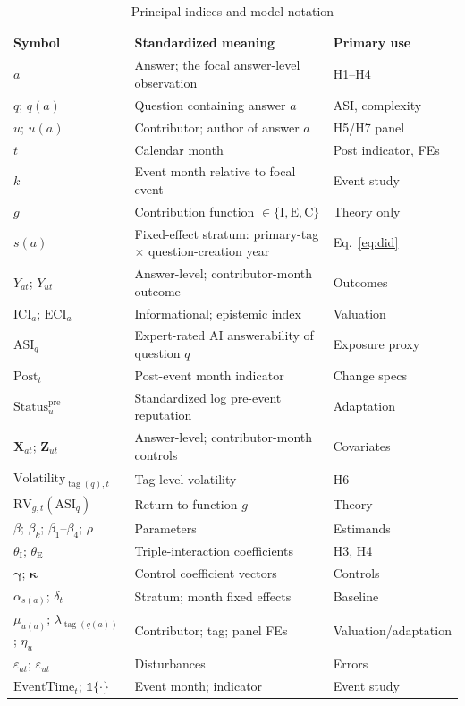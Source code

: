 \begin{table}[t]
\centering
\caption{Principal indices and model notation}
\label{tab:notation}
\scriptsize
\begin{tabular}{@{}p{}p{}p{}@{}}
\toprule
Symbol & Standardized meaning & Primary use \\
\midrule
$a$ & Answer; the focal answer-level observation & H1--H4 \\
$q$; $q(a)$ & Question containing answer $a$ & ASI, complexity \\
$u$; $u(a)$ & Contributor; author of answer $a$ & H5/H7 panel \\
$t$ & Calendar month & Post indicator, FEs \\
$k$ & Event month relative to focal event & Event study \\
$g$ & Contribution function $\in\{\mathrm{I},\mathrm{E},\mathrm{C}\}$ & Theory only \\
$s(a)$ & Fixed-effect stratum: primary-tag $\times$ question-creation year & Eq.~\eqref{eq:did} \\
$Y_{at}$; $Y_{ut}$ & Answer-level; contributor-month outcome & Outcomes \\
$\mathrm{ICI}_a$; $\mathrm{ECI}_a$ & Informational; epistemic index & Valuation \\
$\mathrm{ASI}_q$ & Expert-rated AI answerability of question $q$ & Exposure proxy \\
$\mathrm{Post}_t$ & Post-event month indicator & Change specs \\
$\mathrm{Status}^{\mathrm{pre}}_u$ & Standardized log pre-event reputation & Adaptation \\
$\mathbf{X}_{at}$; $\mathbf{Z}_{ut}$ & Answer-level; contributor-month controls & Covariates \\
$\mathrm{Volatility}_{\operatorname{tag}(q),t}$ & Tag-level volatility & H6 \\
$\mathrm{RV}_{g,t}(\mathrm{ASI}_q)$ & Return to function $g$ & Theory \\
$\beta$; $\beta_k$; $\beta_1$--$\beta_4$; $\rho$ & Parameters & Estimands \\
$\theta_{\mathrm{I}}$; $\theta_{\mathrm{E}}$ & Triple-interaction coefficients & H3, H4 \\
$\boldsymbol{\gamma}$; $\boldsymbol{\kappa}$ & Control coefficient vectors & Controls \\
$\alpha_{s(a)}$; $\delta_t$ & Stratum; month fixed effects & Baseline \\
$\mu_{u(a)}$; $\lambda_{\operatorname{tag}(q(a))}$; $\eta_u$ & Contributor; tag; panel FEs & Valuation/adaptation \\
$\varepsilon_{at}$; $\varepsilon_{ut}$ & Disturbances & Errors \\
$\mathrm{EventTime}_t$; $\mathbb{1}\{\cdot\}$ & Event month; indicator & Event study \\
\bottomrule
\end{tabular}
\end{table}


